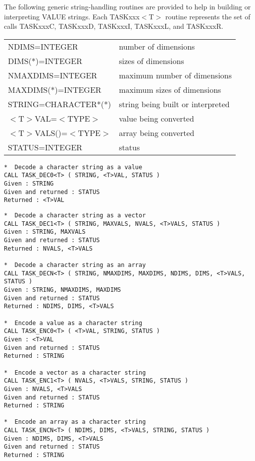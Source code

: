 \documentclass[twoside,11pt]{article}
\renewcommand{\_}{\texttt{\symbol{95}}}
\begin{document}
The following generic string-handling routines are provided to help in 
building or interpreting VALUE strings. Each TASK\_xxx$<$T$>$ routine 
represents the set of calls TASK\_xxxC, TASK\_xxxD, TASK\_xxxI, TASK\_xxxL, 
and TASK\_xxxR.

\small
\begin{center}
\begin{tabular}{ll}
NDIMS=INTEGER            &    number of dimensions \\
DIMS(*)=INTEGER          &    sizes of dimensions \\
NMAXDIMS=INTEGER         &    maximum number of dimensions \\
MAXDIMS(*)=INTEGER       &    maximum sizes of dimensions \\
STRING=CHARACTER*(*)     &    string being built or interpreted \\
$<$T$>$VAL=$<$TYPE$>$    &    value being converted \\
$<$T$>$VALS()=$<$TYPE$>$ &    array being converted \\
STATUS=INTEGER           &    status \\
\end{tabular}
\end{center}
\normalsize

\begin{verbatim}
*  Decode a character string as a value
CALL TASK_DEC0<T> ( STRING, <T>VAL, STATUS )
Given : STRING
Given and returned : STATUS
Returned : <T>VAL
\end{verbatim}
\newpage
\begin{verbatim}
*  Decode a character string as a vector
CALL TASK_DEC1<T> ( STRING, MAXVALS, NVALS, <T>VALS, STATUS )
Given : STRING, MAXVALS
Given and returned : STATUS
Returned : NVALS, <T>VALS

*  Decode a character string as an array
CALL TASK_DECN<T> ( STRING, NMAXDIMS, MAXDIMS, NDIMS, DIMS, <T>VALS, STATUS )
Given : STRING, NMAXDIMS, MAXDIMS
Given and returned : STATUS
Returned : NDIMS, DIMS, <T>VALS

*  Encode a value as a character string
CALL TASK_ENC0<T> ( <T>VAL, STRING, STATUS )
Given : <T>VAL
Given and returned : STATUS
Returned : STRING

*  Encode a vector as a character string
CALL TASK_ENC1<T> ( NVALS, <T>VALS, STRING, STATUS )
Given : NVALS, <T>VALS
Given and returned : STATUS
Returned : STRING

*  Encode an array as a character string
CALL TASK_ENCN<T> ( NDIMS, DIMS, <T>VALS, STRING, STATUS )
Given : NDIMS, DIMS, <T>VALS
Given and returned : STATUS
Returned : STRING
\end{verbatim}
\end{document}
